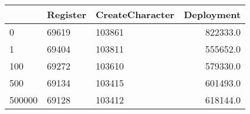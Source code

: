 \begin{tabular}{lllr}
\toprule
{} & Register & CreateCharacter &  Deployment \\
\midrule
0      &    69619 &          103861 &    822333.0 \\
1      &    69404 &          103811 &    555652.0 \\
100    &    69272 &          103610 &    579330.0 \\
500    &    69134 &          103415 &    601493.0 \\
500000 &    69128 &          103412 &    618144.0 \\
\bottomrule
\end{tabular}
